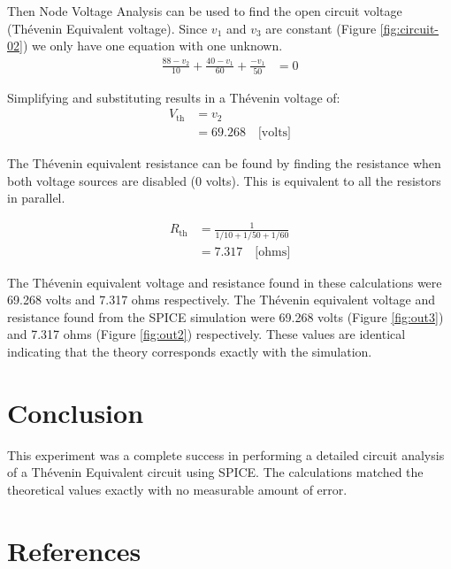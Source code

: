 \documentclass{article}
\begin{document}
Then Node Voltage Analysis can be used to find the open circuit voltage
(Th\'{e}venin Equivalent voltage).
Since $v_1$ and $v_3$ are constant (Figure \ref{fig:circuit-02}) we
only have one equation with one unknown.
\begin{align}
\frac{88 - v_2}{10} + \frac{40 - v_1}{60} + \frac{-v_1}{50} &= 0
\end{align}

Simplifying and substituting results in a Th\'{e}venin voltage of:
\begin{align}
	V_{\mbox{th}} &= v_2 \\
	              &= 69.268 \quad \mbox{[volts]}
\end{align}

The Th\'{e}venin equivalent resistance can be found by finding the resistance
when both voltage sources are disabled (0 volts).
This is equivalent to all the resistors in parallel.

\begin{align}
	R_{\mbox{th}} &= \frac{1}{ 1/10 + 1/50 + 1/60} \\
				  &= 7.317 \quad \mbox{[ohms]}
\end{align}

The Th\'{e}venin equivalent voltage and resistance found in these
calculations were 69.268 volts and 7.317 ohms respectively.
The Th\'{e}venin equivalent voltage and resistance found from
the SPICE simulation were 69.268 volts (Figure \ref{fig:out3})
and 7.317 ohms (Figure \ref{fig:out2}) respectively.
These values are identical indicating that the theory corresponds
exactly with the simulation.


\section{Conclusion}

This experiment was a complete success in performing a detailed
circuit analysis of a Th\'{e}venin Equivalent circuit
using SPICE.
The calculations matched the theoretical values exactly
with no measurable amount of error.


\clearpage

\pagebreak
\renewcommand*{\refname}{\vspace{-8mm}}
\section{References}


\end{document}
